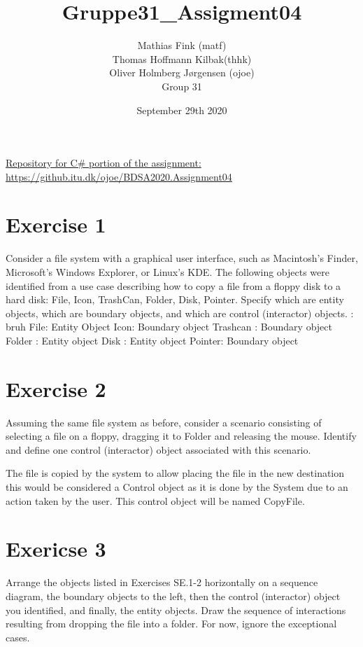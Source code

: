 \documentclass{article}
\title{Gruppe31\_Assigment04}
\author{Mathias Fink (matf)\\ Thomas Hoffmann Kilbak(thhk)\\ Oliver Holmberg Jørgensen (ojoe)\\ Group 31}
\date{September 29th 2020}
\begin{document}
\maketitle

\noindent \href{https://github.itu.dk/ojoe/BDSA2020.Assignment04}{Repository for C\# portion of the assignment:} \\
\url{https://github.itu.dk/ojoe/BDSA2020.Assignment04}

\section{Exercise 1}
Consider a file system with a graphical user interface, such as Macintosh’s Finder, Microsoft’s Windows Explorer, or Linux’s KDE. The following objects were identified from a use case describing how to copy a file from a floppy disk to a hard disk: File, Icon, TrashCan, Folder, Disk, Pointer. Specify which are entity objects, which are boundary objects, and which are control (interactor) objects. :\newline
\newline
bruh
File: Entity Object \newline
Icon: Boundary object \newline
Trashcan : Boundary object \newline
Folder : Entity object \newline
Disk : Entity object \newline
Pointer: Boundary object

\section{Exercise 2}
Assuming the same file system as before, consider a scenario consisting of selecting a file on a floppy, dragging it to Folder and releasing the mouse. Identify and define one control (interactor) object associated with this scenario. \newline

The file is copied by the system to allow placing the file in the new destination this would be considered a Control object as it is done by the System due to an action taken by the user. \newline
This control object will be named CopyFile.

\section{Exericse 3}
Arrange the objects listed in Exercises SE.1-2 horizontally on a sequence diagram, the boundary objects to the left, then the control (interactor) object you identified, and finally, the entity objects. Draw the sequence of interactions resulting from dropping the file into a folder. For now, ignore the exceptional cases.
\end{document}
